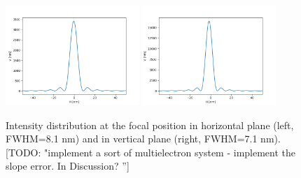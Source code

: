 \documentclass{iucr}              %
\newcommand{\todo}[1]{{\color{red}[TODO: "#1'']}}
\begin{document}
\begin{table}[]
    \centering
    \caption{Beam sizes calculated with simplified wave optics propagation (point source and ideal lenses with aperture for modeling the element dimensions). 
    }
    \label{tablewofry1D}
\end{table}

\begin{figure}
\label{wofry1D}
\centering
\includegraphics[width=0.45\textwidth]{GRAPHICS/wofry1Dh.png}
\includegraphics[width=0.45\textwidth]{GRAPHICS/wofry1Dv.png}
\caption{Intensity distribution at the focal position in horizontal plane (left, FWHM=8.1 nm) and in vertical plane (right, FWHM=7.1 nm).
\todo{implement a sort of multielectron system - implement the slope error. In Discussion? } 
}
\end{figure}
\end{document}
